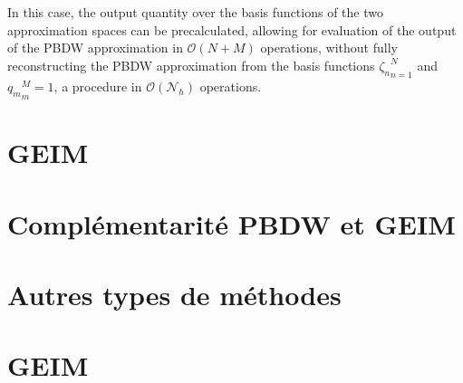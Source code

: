 \documentclass[a4paper,10pt]{beamer}
\numberwithin{equation}{section}
\begin{document}
\begin{frame}
In this case, the output quantity over the basis functions of the two approximation spaces can be precalculated, allowing for evaluation of the output of the PBDW approximation in $\mathcal{O}(N + M)$ operations, without fully reconstructing the PBDW approximation from the basis functions ${\zeta_n}^N_{n=1}$ and ${q_m}^M_m=1$, a procedure in $\mathcal{O}(\mathcal{N}_h)$ operations. 
\end{frame}

\section{\sc GEIM}
\begin{frame}

\end{frame}

\section{\sc Complémentarité PBDW et GEIM}
\section{\sc Autres types de méthodes}

\section{\sc GEIM}
\end{document}
